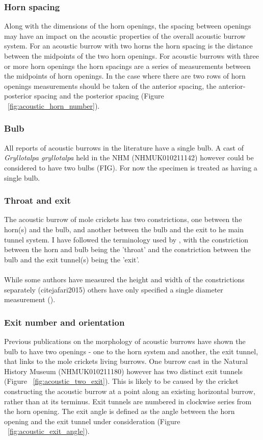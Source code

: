 \documentclass{article}
\begin{document}
   \subsubsection{Horn spacing}
   Along with the dimensions of the horn openings, the spacing between openings may have an impact on the acoustic properties of the overall acoustic burrow system. For an acoustic burrow with two horns the horn spacing is the distance between the midpoints of the two horn openings. For acoustic burrows with three or more horn openings the horn spacings are a series of measurements between the midpoints of horn openings. In the case where there are two rows of horn openings measurements should be taken of the anterior spacing, the anterior-posterior spacing and the posterior spacing (Figure ~\ref{fig:acoustic_horn_number}).
   
   \subsubsection{Bulb}
   All reports of acoustic burrows in the literature have a single bulb. A cast of \textit{Gryllotalpa gryllotalpa} held in the NHM (NHMUK010211142) however could be considered to have two bulbs (FIG). For now the specimen is treated as having a single bulb.
   
   \subsubsection{Throat and exit}
   The acoustic burrow of mole crickets has two constrictions, one between the horn(s) and the bulb, and another between the bulb and the exit to he main tunnel system. I have followed the terminology used by \cite{jafari2015}, with the constriction between the horn and bulb being the 'throat' and the constriction between the bulb and the exit tunnel(s) being the 'exit'.
   
   \paragraph{}
   While some authors have measured the height and width of the constrictions separately (cite{jafari2015}) others have only specified a single diameter measurement (\cite{kavanagh1989}). 
   
   \subsubsection{Exit number and orientation}
   Previous publications on the morphology of acoustic burrows have shown the bulb to have two openings - one to the horn system and another, the exit tunnel, that links to the mole crickets living burrows. One burrow cast in the Natural History Museum (NHMUK010211180) however has two distinct exit tunnels (Figure ~\ref{fig:acoustic_two_exit}). This is likely to be caused by the cricket constructing the acoustic burrow at a point along an existing horizontal burrow, rather than at its terminus.  Exit tunnels are numbered in clockwise series from the horn opening. The exit angle is defined as the angle between the horn opening and the exit tunnel under consideration (Figure ~\ref{fig:acoustic_exit_angle}).
   
\end{document}
